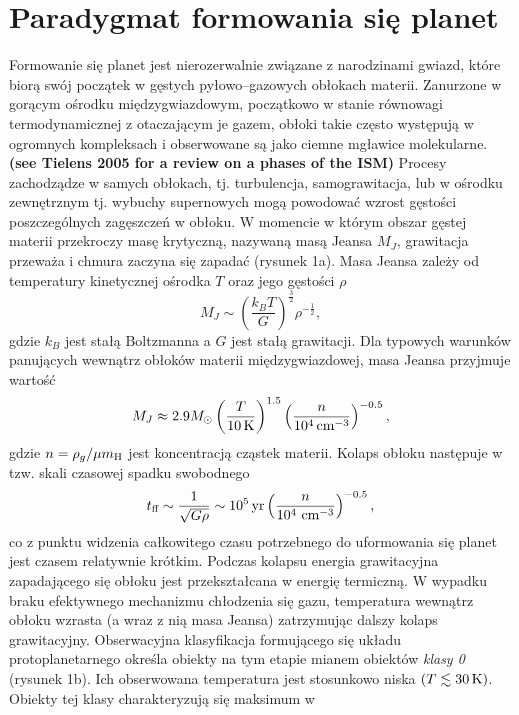 \section{Paradygmat formowania się planet}
Formowanie się planet jest nierozerwalnie związane z narodzinami gwiazd, które
biorą swój początek w gęstych pyłowo--gazowych obłokach materii. Zanurzone w
gorącym ośrodku międzygwiazdowym, początkowo w stanie równowagi termodynamicznej
z otaczającym je gazem, obłoki takie często występują w
ogromnych kompleksach i obserwowane są jako ciemne mgławice molekularne. {\bf
(see Tielens 2005 for a review on a phases of the ISM)} Procesy zachodządze w
samych obłokach, tj. turbulencja, samograwitacja, lub w ośrodku zewnętrznym tj.
wybuchy supernowych mogą powodować wzrost gęstości poszczególnych zagęszczeń w
obłoku. W momencie w którym obszar gęstej materii przekroczy  masę krytyczną,
nazywaną masą Jeansa $M_J$, grawitacja przeważa i chmura zaczyna się zapadać
(rysunek 1a). Masa Jeansa zależy od temperatury kinetycznej ośrodka $T$ oraz
jego gęstości $\rho$ \begin{equation} M_J \sim \left( \frac{k_B T}{G} \right)
^\frac{3}{2} {\rho}^{-\frac{1}{2}}, \end{equation} gdzie $k_B$ jest stałą
Boltzmanna a $G$ jest stałą grawitacji. Dla typowych warunków panujących
wewnątrz obłoków materii międzygwiazdowej, masa Jeansa przyjmuje wartość
\begin{equation}
 M_J \approx 2.9 M_{\odot} \left(\frac{T}{10\hbox{$\thinspace\textrm{K}$}}\right)^{1.5} 
 \left(\frac{n}{10^4\hbox{$\thinspace\textrm{cm}$}^{-3}}\right)^{-0.5},
\end{equation}
gdzie $n = \rho_g / \mu \hbox{$m_{\textrm{H}}$}$ jest koncentracją cząstek materii.
Kolaps obłoku następuje w tzw. skali czasowej spadku swobodnego
\begin{equation}
   t_{\textrm{ff}} \sim \frac{1}{\sqrt{G\rho}} \sim 10^5\hbox{$\thinspace\textrm{yr}$}
   \left(\frac{n}{10^4\thinspace \hbox{$\thinspace\textrm{cm}$}^{-3}}\right)^{-0.5},
\end{equation}
co z punktu widzenia całkowitego czasu potrzebnego do uformowania się planet
jest czasem relatywnie krótkim. Podczas kolapsu energia
grawitacyjna zapadającego się obłoku jest przekształcana w energię termiczną.  W
wypadku braku efektywnego mechanizmu chłodzenia się gazu, temperatura wewnątrz
obłoku wzrasta (a wraz z nią masa Jeansa) zatrzymując dalszy kolaps
grawitacyjny. Obserwacyjna klasyfikacja formującego się układu protoplanetarnego
określa obiekty na tym etapie mianem obiektów \emph{klasy 0}~\cite{andre} (rysunek 1b).
Ich obserwowana temperatura jest stosunkowo niska $(T \lesssim
30\hbox{$\thinspace\textrm{K}$})$. Obiekty tej klasy charakteryzują się maksimum w
